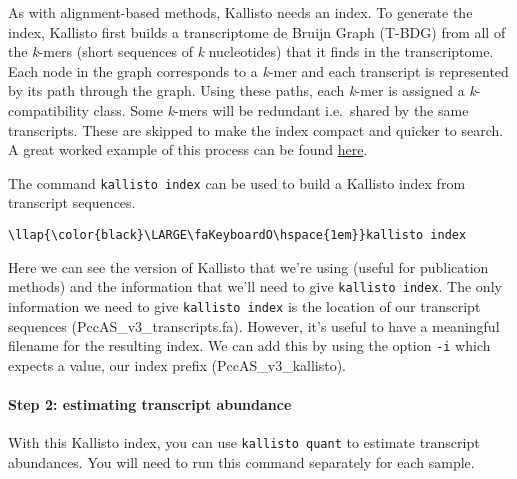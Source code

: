 \documentclass[11pt]{article}
\begin{document}
As with alignment-based methods, Kallisto needs an index. To generate
the index, Kallisto first builds a transcriptome de Bruijn Graph (T-BDG)
from all of the \textit{k}-mers (short sequences of \textit{k} nucleotides)
that it finds in the transcriptome. Each node in the graph corresponds
to a \textit{k}-mer and each transcript is represented by its path through
the graph. Using these paths, each \textit{k}-mer is assigned a
\textit{k}-compatibility class. Some \textit{k}-mers will be redundant
i.e.~shared by the same transcripts. These are skipped to make the index
compact and quicker to search. A great worked example of this process
can be found
\href{http://bioinfo.iric.ca/understanding-how-kallisto-works/}{here}.

The command \texttt{kallisto\ index} can be used to build a Kallisto
index from transcript sequences.





\begin{terminalinput}
\begin{Verbatim}[commandchars=\\\{\}]
\llap{\color{black}\LARGE\faKeyboardO\hspace{1em}}kallisto index
\end{Verbatim}
\end{terminalinput}



    Here we can see the version of Kallisto that we're using (useful for
publication methods) and the information that we'll need to give
\texttt{kallisto\ index}. The only information we need to give
\texttt{kallisto\ index} is the location of our transcript sequences
(PccAS\_v3\_transcripts.fa). However, it's useful to have a meaningful
filename for the resulting index. We can add this by using the option
\texttt{-i} which expects a value, our index prefix
(PccAS\_v3\_kallisto).

    \hypertarget{step-2-estimating-transcript-abundance}{%
\paragraph{Step 2: estimating transcript
abundance}\label{step-2-estimating-transcript-abundance}}

With this Kallisto index, you can use \texttt{kallisto\ quant} to
estimate transcript abundances. You will need to run this command
separately for each sample.
\end{document}
